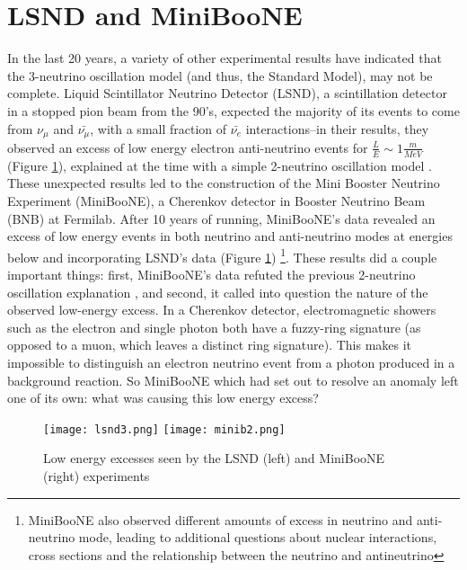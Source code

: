 \documentclass[12pt]{article}
\begin{document}
\section{LSND and MiniBooNE}
In the last 20 years, a variety of other experimental results have indicated that the 3-neutrino oscillation model (and thus, the Standard Model), may not be complete. Liquid Scintillator Neutrino Detector (LSND), a scintillation detector in a stopped pion beam from the 90's, expected the majority of its events to come from $\nu_\mu$ and $\bar{\nu_\mu}$, with a small fraction of $\bar{\nu_e}$ interactions--in their results, they observed an excess of low energy electron anti-neutrino events for $\frac{L}{E} \sim 1 \frac{m}{MeV}$ (Figure \ref{fig:lsnd}), explained at the time with a simple 2-neutrino oscillation model \cite{lsnd}. These unexpected results led to the construction of the Mini Booster Neutrino Experiment (MiniBooNE), a Cherenkov detector in Booster Neutrino Beam (BNB) at Fermilab. After 10 years of running, MiniBooNE's data revealed an excess of low energy events in both neutrino and anti-neutrino modes at energies below and incorporating LSND's data (Figure \ref{fig:lsnd}) \footnote{ MiniBooNE also observed different amounts of excess in neutrino and anti-neutrino mode, leading to additional questions about nuclear interactions, cross sections and the relationship between the neutrino and antineutrino\cite{miniboone}}.  These results did a couple important things: first, MiniBooNE's data refuted the previous 2-neutrino oscillation explanation \cite{miniboone}, and second, it called into question the nature of the observed low-energy excess. In a Cherenkov detector, electromagnetic showers such as the electron and single photon both have a fuzzy-ring signature (as opposed to a muon, which leaves a distinct ring signature). This makes it impossible to distinguish an electron neutrino event from a photon produced in a background reaction. So MiniBooNE which had set out to resolve an anomaly left one of its own: what was causing this low energy excess? 
\begin{figure}[h!]
\centering
\texttt{[image: lsnd3.png]}
\hspace{1.5 cm}
\texttt{[image: minib2.png]}
\caption{Low energy excesses seen by the LSND (left) and MiniBooNE (right) experiments}
\label{fig:lsnd}
\end{figure}
\end{document}
